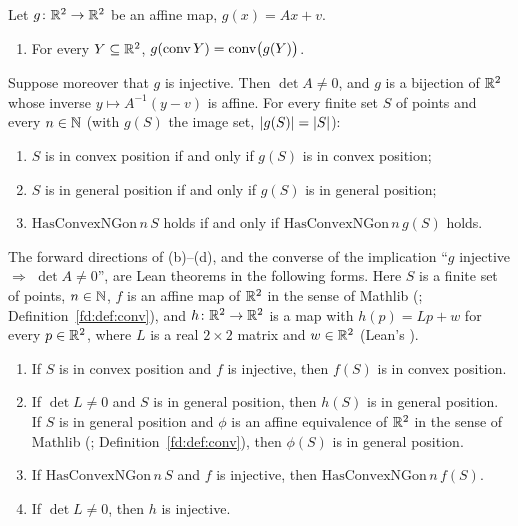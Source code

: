 \begin{lemma}\label{fd:lem:affine-cp}\raggedright
Let $g\colon\mathbb R^2\to\mathbb R^2$ be an affine map, $g(x)=Ax+v$.
\begin{enumerate}[label=(\alph*)]
\item For every $Y\subseteq\mathbb R^2$, $g(\operatorname{conv} Y)=\operatorname{conv}\bigl(g(Y)\bigr)$.
\end{enumerate}
Suppose moreover that $g$ is injective. Then $\det A\ne0$, and $g$ is a bijection of $\mathbb R^2$ whose inverse
$y\mapsto A^{-1}(y-v)$ is affine. For every finite set $S$ of points and every $n\in\mathbb N$ (with $g(S)$ the
image set, $\lvert g(S)\rvert=\lvert S\rvert$):
\begin{enumerate}[label=(\alph*),resume]
\item $S$ is in convex position if and only if $g(S)$ is in convex position;
\item $S$ is in general position if and only if $g(S)$ is in general position;
\item $\mathrm{HasConvexNGon}\,n\,S$ holds if and only if $\mathrm{HasConvexNGon}\,n\,g(S)$ holds.
\end{enumerate}
The forward directions of (b)--(d), and the converse of the implication ``$g$ injective $\Rightarrow$
$\det A\ne0$'', are Lean theorems in the following forms. Here $S$ is a finite set of points, $n\in\mathbb N$,
$f$ is an affine map of $\mathbb R^2$ in the sense of Mathlib (; Definition~\ref{fd:def:conv}),
and $h\colon\mathbb R^2\to\mathbb R^2$ is a map with $h(p)=Lp+w$ for every $p\in\mathbb R^2$, where $L$ is a real $2\times2$
matrix and $w\in\mathbb R^2$ (Lean's ).
\begin{enumerate}[label=(\alph*$'$),start=2]
\item If $S$ is in convex position and $f$ is injective, then $f(S)$ is in convex position.
\item If $\det L\ne0$ and $S$ is in general position, then $h(S)$ is in general position. If $S$ is in
  general position and $\phi$ is an affine equivalence of $\mathbb R^2$ in the sense of Mathlib
  (; Definition~\ref{fd:def:conv}), then $\phi(S)$ is in general position.
\item If $\mathrm{HasConvexNGon}\,n\,S$ and $f$ is injective, then $\mathrm{HasConvexNGon}\,n\,f(S)$.
\item If $\det L\ne0$, then $h$ is injective.
\end{enumerate}
\end{lemma}

